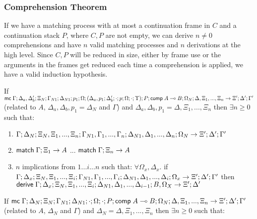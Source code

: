 \subsubsection{Comprehension Theorem}

If we have a matching process with at most a continuation frame in $C$ and a continuation stack $P$, where $C, P$ are not empty, we can derive $n \neq 0$ comprehensions and have $n$ valid matching processes and $n$ derivations at the high level. Since $C, P$ will be reduced in size, either by frame use or the arguments in the frames get reduced each time a comprehension is applied, we have a valid induction hypothesis.

\begin{theorem}
   If $\mathsf{mc} \; \Gamma; \Delta_a, \Delta'_b; \Xi_N; \Gamma_{N1}; \Delta_{N1}; p_1; \Omega; (\Delta_a, p_1; \Delta'_b; \cdot; p; \Omega; \cdot; \Upsilon); P; \mathsf{comp} \; A \multimap B; \Omega_N; \Delta, \Xi_1, ..., \Xi_n \rightarrow \Xi'; \Delta'; \Gamma'$ (related to $A$, $\Delta_a, \Delta_b, p_1 = \Delta_N$ and $\Gamma$) and $\Delta_a, \Delta_b, p_1 = \Delta, \Xi_1, ..., \Xi_n$  then $\exists n \geq 0$ such that:
   
   \begin{enumerate}
      \item $\do \Gamma; \Delta_N; \Xi_N, \Xi_1, ..., \Xi_n; \Gamma_{N1}, \Gamma_1, ..., \Gamma_n; \Delta_{N1}, \Delta_1, ..., \Delta_n; \Omega_N \rightarrow \Xi'; \Delta'; \Gamma'$
      \item $\mathsf{match} \; \Gamma; \Xi_1 \rightarrow A$ ... $\mathsf{match} \; \Gamma; \Xi_n \rightarrow A$
      \item $n$ implications from $1...i...n$ such that: $\forall \Omega_x, \Delta_x.$ if $\do \Gamma; \Delta_x; \Xi_N, \Xi_1, ..., \Xi_i; \Gamma_{N1}, \Gamma_1, ..., \Gamma_i; \Delta_{N1}, \Delta_1, ..., \Delta_i; \Omega_x \rightarrow \Xi'; \Delta'; \Gamma'$ then $\mathsf{derive} \; \Gamma; \Delta_x; \Xi_N, \Xi_1, ..., \Xi_i; \Delta_{N1}, \Delta_1, ..., \Delta_{i-1}; B, \Omega_X \rightarrow \Xi'; \Delta'$
   \end{enumerate}
   
   If $\mathsf{mc} \; \Gamma; \Delta_N; \Xi_N; \Gamma_{N1}; \Delta_{N1}; \cdot; \Omega; \cdot; P; \mathsf{comp} \; A \multimap B; \Omega_N; \Delta, \Xi_1, ..., \Xi_n \rightarrow \Xi'; \Delta'; \Gamma'$ (related to $A$, $\Delta_N$ and $\Gamma$) and $\Delta_N = \Delta, \Xi_1, ..., \Xi_n$ then $\exists n \geq 0$ such that:
   

\end{theorem}

